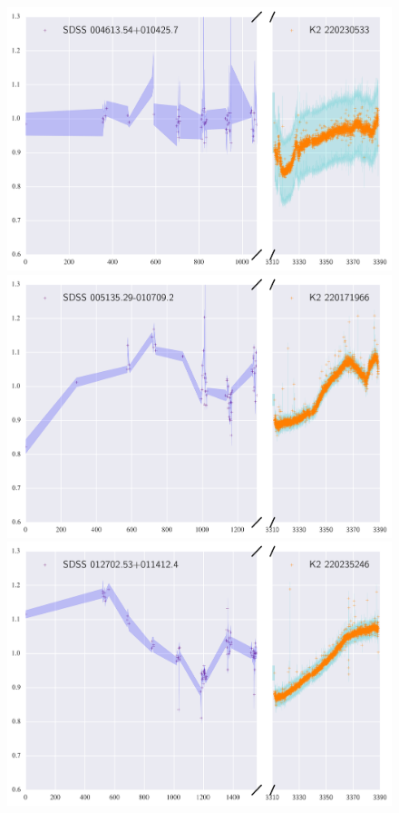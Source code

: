 \documentclass[a4paper,fleqn,usenatbib]{mnras}
\begin{document}
    \begin{figure}
 	\includegraphics[width=\columnwidth]{220230533ExtendedLC.png}
     	\includegraphics[width=\columnwidth]{220171966ExtendedLC.png}
     	 	\includegraphics[width=\columnwidth]{220235246ExtendedLC.png}
    	\caption{}
    	\label{fig:example_figure}
    \end{figure}
    
\end{document}
